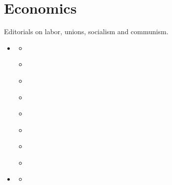 \documentclass[letterpaper,10pt,english]{jupyterBook}
\begin{document}
\chapter{Economics}
\label{\detokenize{Sections/economics:economics}}\label{\detokenize{Sections/economics::doc}}
\sphinxAtStartPar
Editorials on labor, unions, socialism and communism.
\begin{itemize}
\item {} 
\sphinxAtStartPar
{\hyperref[\detokenize{Sections/labor::doc}]{}}
\begin{itemize}
\item {} 
\sphinxAtStartPar
{\hyperref[\detokenize{Volumes/03/06/servant_in_the_south::doc}]{}}

\item {} 
\sphinxAtStartPar
{\hyperref[\detokenize{Volumes/15/05/the_black_man_and_the_unions::doc}]{}}

\item {} 
\sphinxAtStartPar
{\hyperref[\detokenize{Volumes/18/05/labor_omnia_vincit::doc}]{}}

\item {} 
\sphinxAtStartPar
{\hyperref[\detokenize{Volumes/28/04/american_federation_of_labor::doc}]{}}

\item {} 
\sphinxAtStartPar
{\hyperref[\detokenize{Volumes/31/02/black_man_and_labor::doc}]{}}

\item {} 
\sphinxAtStartPar
{\hyperref[\detokenize{Volumes/31/06/again_pullman_porters::doc}]{}}

\item {} 
\sphinxAtStartPar
{\hyperref[\detokenize{Volumes/39/09/employment::doc}]{}}

\item {} 
\sphinxAtStartPar
{\hyperref[\detokenize{Volumes/40/12/af_of_l::doc}]{}}

\end{itemize}

\item {} 
\sphinxAtStartPar
{\hyperref[\detokenize{Sections/socialism::doc}]{}}
\begin{itemize}
\item {} 
\sphinxAtStartPar
{\hyperref[\detokenize{Volumes/19/04/cooperation::doc}]{}}


\end{itemize}
\end{itemize}
\end{document}
